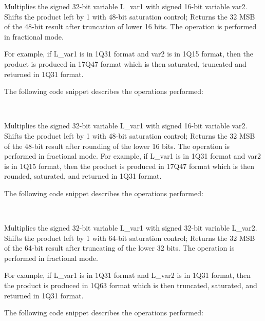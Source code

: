 
Multiplies the signed 32-bit variable L\_var1 with signed 16-bit variable var2.
Shifts the product left by 1 with 48-bit saturation control;
Returns the 32 MSB of the 48-bit result after truncation of lower 16 bits.
The operation is performed in fractional mode.

For example, if L\_var1 is in 1Q31 format and var2 is in 1Q15 format, then the product is produced in 17Q47 format which is then saturated, truncated and returned in 1Q31 format.

The following code snippet describes the operations performed:

\\



Multiplies the signed 32-bit variable L\_var1 with signed 16-bit variable var2. Shifts the product left by 1 with 48-bit saturation control; Returns the 32 MSB of the 48-bit result after rounding of the lower 16 bits.
The operation is performed in fractional mode.
For example, if L\_var1 is in 1Q31 format and var2 is in 1Q15 format, then the product is produced in 17Q47 format which is then rounded, saturated, and returned in 1Q31 format.

The following code snippet describes the operations performed:

\\


Multiplies the signed 32-bit variable L\_var1 with signed 32-bit variable L\_var2.
Shifts the product left by 1 with 64-bit saturation control;
Returns the 32 MSB of the 64-bit result after truncating of the lower 32 bits.
The operation is performed in fractional mode.

For example, if L\_var1 is in 1Q31 format and L\_var2 is in 1Q31 format, then the product is produced in 1Q63 format which is then truncated, saturated, and returned in 1Q31 format.

The following code snippet describes the operations performed:

